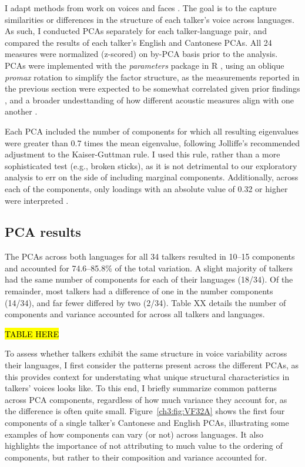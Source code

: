 I adapt methods from work on voices \citep{lee_2019_acoustic,lee_2020_language} and faces \citep{burton_2016_faces,turk_1991_eigenfaces}. The goal is to the capture similarities or differences in the structure of each talker's voice across languages. As such, I conducted PCAs separately for each talker-language pair, and compared the results of each talker's English and Cantonese PCAs. All 24 measures were normalized (z-scored) on by-PCA basis prior to the analysis. PCAs were implemented with the \textit{parameters} package \citep{makowski_2019_parameters} in R \citep{r_2021}, using an oblique \textit{promax} rotation to simplify the factor structure, as the measurements reported in the previous section were expected to be somewhat correlated given prior findings \citep{lee_2019_acoustic}, and a broader undesttanding of how different acoustic measures align with one another \citep{kreiman_2014_theory, kreiman_2021_validating}.

Each PCA included the number of components for which all resulting eigenvalues were greater than 0.7 times the mean eigenvalue, following Jolliffe's \citep{jolliffe_2002_pca} recommended adjustment to the Kaiser-Guttman rule. I used this rule, rather than a more sophisticated test (e.g., broken sticks), as it is not detrimental to our exploratory analysis to err on the side of including marginal components. Additionally, across each of the components, only loadings with an absolute value of 0.32 or higher were interpreted \citep{lee_2019_acoustic,tabachnick_2013_statistics}.

\subsection{PCA results}\label{ch3:sec:pca_results} 
The PCAs across both languages for all 34 talkers resulted in 10--15 components and accounted for 74.6--85.8\% of the total variation. A slight majority of talkers had the same number of components for each of their languages (18/34). Of the remainder, most talkers had a difference of one in the number components (14/34), and far fewer differed by two (2/34). Table XX details the number of components and variance accounted for across all talkers and languages. 

\hl{TABLE HERE}

To assess whether talkers exhibit the same structure in voice variability across their languages, I first consider the patterns present across the different PCAs, as this provides context for understating what unique structural characteristics in talkers' voices looks like. To this end, I briefly summarize common patterns across PCA components, regardless of how much variance they account for, as the difference is often quite small. Figure~\ref{ch3:fig:VF32A} shows the first four components of a single talker's Cantonese and English PCAs, illustrating some examples of how components can vary (or not) across languages. It also highlights the importance of not attributing to much value to the ordering of components, but rather to their composition and variance accounted for.

